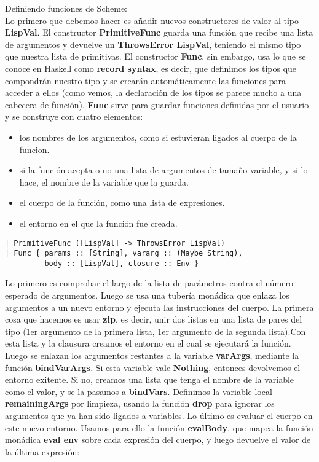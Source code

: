 Definiendo funciones de Scheme:\\

Lo primero que debemos hacer es a\~{n}adir nuevos constructores de valor al tipo \textbf{LispVal}. El constructor \textbf{PrimitiveFunc} guarda una funci\'on que recibe una lista de argumentos y devuelve un \textbf{ThrowsError LispVal}, teniendo el mismo tipo que nuestra lista de primitivas. El constructor \textbf{Func}, sin embargo, usa lo que se conoce en Haskell como \textbf{record syntax}, es decir, que definimos los tipos que compondr\'an nuestro tipo y se crear\'an autom\'aticamente las funciones para acceder a ellos (como vemos, la declaraci\'on de los tipos se parece mucho a una cabecera de funci\'on). \textbf{Func} sirve para guardar funciones definidas por el usuario y se construye con cuatro elementos:

\begin{itemize}
  \item los nombres de los argumentos, como si estuvieran ligados al cuerpo de la funcion.
  \item si la funci\'on acepta o no una lista de argumentos de tama\~{n}o variable, y si lo hace, el nombre de la variable que la guarda.
  \item el cuerpo de la funci\'on, como una lista de expresiones.
  \item el entorno en el que la funci\'on fue creada.
\end{itemize}

\begin{minipage}{\linewidth}
\begin{scriptsize}
\begin{lstlisting}[frame=single]
| PrimitiveFunc ([LispVal] -> ThrowsError LispVal)
| Func { params :: [String], vararg :: (Maybe String),
         body :: [LispVal], closure :: Env }
\end{lstlisting}
\end{scriptsize}
\end{minipage}

Lo primero es comprobar el largo de la lista de par\'ametros contra el n\'umero esperado de argumentos. Luego se usa una tuber\'ia mon\'adica que enlaza los argumentos a un nuevo entorno y ejecuta las instrucciones del cuerpo. La primera cosa que hacemos es usar \textbf{zip}, es decir, unir dos listas en una lista de pares del tipo (1er argumento de la primera lista, 1er argumento de la segunda lista).Con esta lista y la clausura creamos el entorno en el cual se ejecutar\'a la funci\'on. Luego se enlazan los argumentos restantes a la variable \textbf{varArgs}, mediante la funci\'on \textbf{bindVarArgs}. Si esta variable vale \textbf{Nothing}, entonces devolvemos el entorno exitente. Si no, creamos una lista que tenga el nombre de la variable como el valor, y se la pasamos a \textbf{bindVars}. Definimos la variable local \textbf{remainingArgs} por limpieza, usando la funci\'on \textbf{drop} para ignorar los argumentos que ya han sido ligados a variables. Lo \'ultimo es evaluar el cuerpo en este nuevo entorno. Usamos para ello la funci\'on \textbf{evalBody}, que mapea la funci\'on mon\'adica \textbf{eval env} sobre cada expresi\'on del cuerpo, y luego devuelve el valor de la \'ultima expresi\'on:

